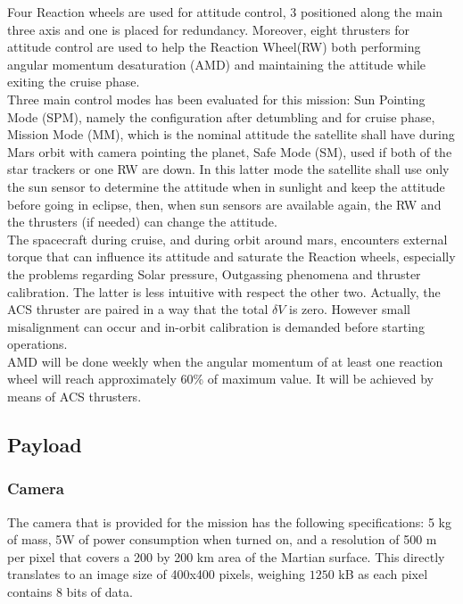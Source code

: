 \documentclass[a4paper, oneside, 11pt]{article}
\begin{document}
Four Reaction wheels are used for attitude control, 3 positioned along the main three axis and one is placed for redundancy. Moreover, eight thrusters for attitude control are used to help the Reaction Wheel(RW) both performing angular momentum desaturation (AMD) and maintaining the attitude while exiting the cruise phase.\\
Three main control modes has been evaluated for this mission: Sun Pointing Mode (SPM), namely the configuration after detumbling and for cruise phase, Mission Mode (MM), which is the nominal attitude the satellite shall have during Mars orbit with camera pointing the planet, Safe Mode (SM), used if both of the star trackers or one RW are down. In this latter mode the satellite shall use only the sun sensor to determine the attitude when in sunlight and keep the attitude before going in eclipse, then, when sun sensors are available again, the RW and the thrusters (if needed) can change the attitude.\\
The spacecraft during cruise, and during orbit around mars, encounters external torque that can influence its attitude and saturate the Reaction wheels, especially the problems regarding Solar pressure, Outgassing phenomena and thruster calibration. The latter is less intuitive with respect the other two. Actually, the ACS thruster are paired in a way that the total $\delta V$ is zero. However small misalignment can occur and in-orbit calibration is demanded before starting operations. \\ 
AMD will be done weekly when the angular momentum of at least one reaction wheel will reach approximately 60\% of maximum value. It will be achieved by means of ACS thrusters.

\subsection{Payload}

\subsubsection{Camera}
The camera that is provided for the mission has the following specifications: 5 kg of mass, 5W of power consumption when turned on, and a resolution of 500 m per pixel that covers a 200 by 200 km area of the Martian surface. This directly translates to an image size of 400x400 pixels, weighing $1250$ kB as each pixel contains 8 bits of data.
\end{document}
